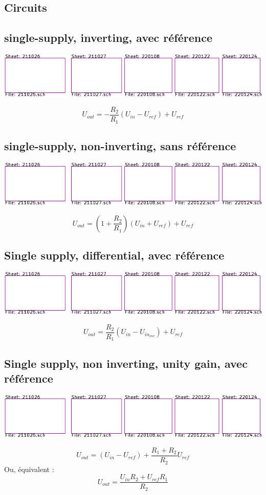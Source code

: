 \documentclass[resume]{subfiles}
\begin{document}
\begin{multicols}{3}
\section{Circuits}
\subsection{single-supply, inverting, avec référence}
\begin{center}
\includegraphics[scale=1,page=15]{../KiCad/resume-crop.pdf}
\end{center}
$$\boxed{U_{out}=-\frac{R_2}{R_1}\left(U_{in}-U_{ref}\right)+U_{ref}}$$
\subsection{single-supply, non-inverting, sans référence}
\begin{center}
\includegraphics[scale=1,page=16]{../KiCad/resume-crop.pdf}
\end{center}
$$\boxed{U_{out}=\left(1+\frac{R_2}{R_1}\right)\left(U_{in}+U_{ref}\right)+U_{ref}}$$
\columnbreak
\subsection{Single supply, differential, avec référence}
\label{sec_ss_diff_ref}
\begin{center}
\includegraphics[scale=1,page=5]{../KiCad/resume-crop.pdf}
\end{center}
$$\boxed{U_{out}=\frac{R_2}{R_1}\left(U_{in}-U_{in_{inv}}\right)+U_{ref}}$$
\subsection{Single supply, non inverting, unity gain, avec référence}
\begin{center}
\includegraphics[scale=1,page=3]{../KiCad/resume-crop.pdf}
\end{center}
$$\boxed{U_{out}=\left(U_{in}-U_{ref}\right)+\frac{R_1+R_2}{R_2}U_{ref}}$$
Ou, équivalent :
$$\boxed{U_{out}=\frac{U_{in}R_2+U_{ref}R_1}{R_2}}$$

\end{multicols}
\end{document}
